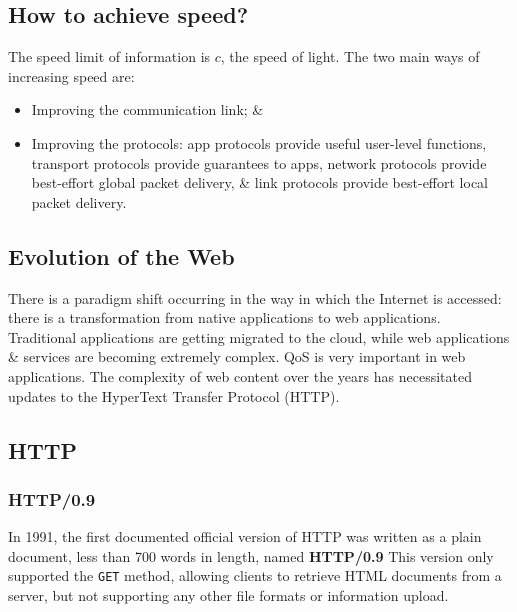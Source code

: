 \documentclass[a4paper,11pt]{article}
\begin{document}
\subsection{How to achieve speed?}
The speed limit of information is $c$, the speed of light.
The two main ways of increasing speed are:
\begin{itemize}
    \item   Improving the communication link; \&
    \item   Improving the protocols: app protocols provide useful user-level functions, transport protocols provide guarantees to apps, network protocols provide best-effort global packet delivery, \& link protocols provide best-effort local packet delivery.
\end{itemize}

\subsection{Evolution of the Web}
There is a paradigm shift occurring in the way in which the Internet is accessed:
there is a transformation from native applications to web applications.
Traditional applications are getting migrated to the cloud, while web applications \& services are becoming extremely complex.
QoS is very important in web applications.
The complexity of web content over the years has necessitated updates to the HyperText Transfer Protocol (HTTP).

\subsection{HTTP}
\subsubsection{HTTP/0.9}
In 1991, the first documented official version of HTTP was written as a plain document, less than 700 words in length, named \textbf{HTTP/0.9}
This version only supported the \verb|GET| method, allowing clients to retrieve HTML documents from a server, but not supporting any other file formats or information upload.
\end{document}

